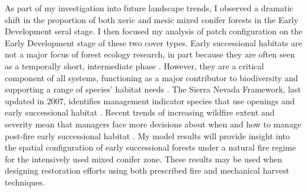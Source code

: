 As part of my investigation into future landscape trends, I observed a dramatic shift in the proportion of both xeric and mesic mixed conifer forests in the Early Development seral stage. I then focused my analysis of patch configuration on the Early Development stage of these two cover types. Early successional habitats are not a major focus of forest ecology research, in part because they are often seen as a temporally short, intermediate phase \citep{Swanson2011}. However, they are a critical component of all systems, functioning as a major contributor to biodiversity and supporting a range of species' habitat needs \citep{Chang1995,Hutto2008,Swanson2011}. The Sierra Nevada Framework, last updated in 2007, identifies management indicator species that use openings and early successional habitat \citep{USDAForestService2004,USDAForestService2007}. Recent trends of increasing wildfire extent and severity mean that managers face more decisions about when and how to manage post-fire early successional habitat \citep{Stephens2013,Dellasala2014}. My model results will provide insight into the spatial configuration of early successional forests under a natural fire regime for the intensively used mixed conifer zone. These results may be used when designing restoration efforts using both prescribed fire and mechanical harvest techniques.





